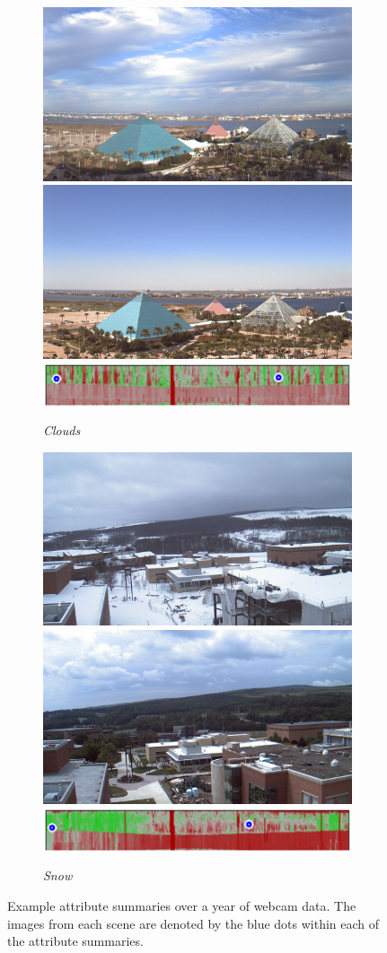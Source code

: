 \documentclass[10pt,twocolumn,letterpaper]{article}
\begin{document}
\begin{figure}
	\centering
  \begin{subfigure}[b]{\columnwidth}
    \centering
		\includegraphics[width=0.49\columnwidth]{figs/cam_summary/623_01191411.jpg}
		\includegraphics[width=0.49\columnwidth]{figs/cam_summary/623_10071911.jpg}
		\includegraphics[width=\columnwidth]{figs/cam_summary/00000623_clouds.pdf}
    \caption{\emph{Clouds}}
    \label{fig:clouds}
	\end{subfigure}	
  \begin{subfigure}[b]{\columnwidth}
    \centering
		\includegraphics[width=0.49\columnwidth]{figs/cam_summary/260_01011844.jpg}
		\includegraphics[width=0.49\columnwidth]{figs/cam_summary/260_09011714.jpg}
    \includegraphics[width=\columnwidth]{figs/cam_summary/00000260_snow.pdf}
    \caption{\emph{Snow}}
    \label{fig:snow}
	\end{subfigure}	
	\caption{Example attribute summaries over a year of webcam data.  The images
           from each scene are denoted by the blue dots within each of the 
           attribute summaries.}
	\label{fig:webcam_summary}
\end{figure}
\end{document}
